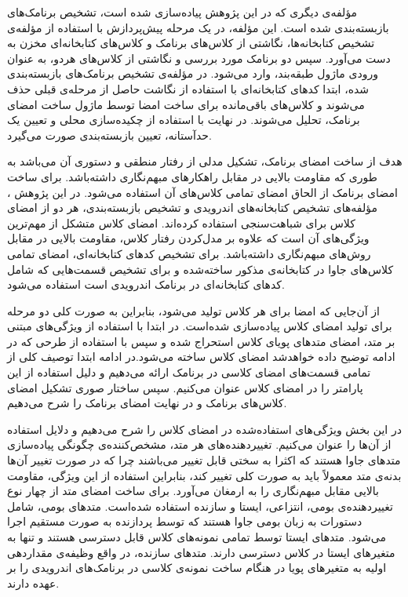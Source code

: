 مؤلفه‌ی دیگری که در این پژوهش پیاده‌سازی شده است، تشخیص برنامک‌های بازبسته‌بندی شده است. این مؤلفه‌، در یک مرحله پیش‌پردازش با استفاده از مؤلفه‌ی تشخیص کتابخانه‌ها، نگاشتی از کلاس‌های برنامک و کلاس‌های کتابخانه‌ای مخزن به دست می‌آورد. سپس دو برنامک مورد بررسی و نگاشتی از کلاس‌‌های هردو، به عنوان ورودی ماژول طبقه‌بند، وارد می‌شود. در مؤلفه‌ی‌ تشخیص برنامک‌های بازبسته‌بندی شده، ابتدا کد‌های کتابخانه‌ای با استفاده از نگاشت حاصل از مرحله‌ی قبلی حذف می‌شوند و کلاس‌های باقی‌مانده برای ساخت امضا توسط ماژول ساخت امضا‌ی برنامک، تحلیل می‌شوند. در نهایت با استفاده از چکیده‌سازی محلی و تعیین یک حدآستانه، تعیین بازبسته‌بندی صورت می‌گیرد.

هدف از ساخت امضای برنامک، تشکیل مدلی از رفتار منطقی و دستوری آن می‌باشد به طوری که مقاومت بالایی در مقابل راهکار‌های مبهم‌نگاری داشته‌باشد. برای ساخت امضای‌ برنامک از الحاق امضای تمامی کلاس‌های آن استفاده می‌شود. در این پژوهش ، مؤلفه‌ها‌ی تشخیص کتابخانه‌های اندرویدی و تشخیص بازبسته‌بندی، هر دو از امضا‌ی کلاس برای شباهت‌سنجی استفاده کرده‌اند. امضای کلاس‌ متشکل از مهم‌ترین ویژگی‌های آن است که علاوه بر مدل‌کردن رفتار کلاس، مقاومت بالایی در مقابل روش‌های مبهم‌نگاری داشته‌باشد. برای تشخیص کد‌های کتابخانه‌ای، امضای تمامی کلاس‌های جاوا در کتابخانه‌ی مذکور ساخته‌شده و برای تشخیص قسمت‌هایی که شامل‌ کد‌های کتابخانه‌ای در برنامک اندرویدی است استفاده می‌شود.

از آن‌جایی که امضا برای هر کلاس تولید می‌شود، بنابراین به صورت کلی دو مرحله برای تولید امضا‌ی کلاس پیاده‌سازی شده‌است. در ابتدا با استفاده از ویژگی‌های مبتنی بر متد، امضای متد‌های پویای کلاس استحراج شده و سپس با استفاده از طرحی که در ادامه توضیح داده خواهد‌شد امضای کلاس ساخته می‌شود.در ادامه ابتدا توصیف کلی از تمامی قسمت‌های امضای کلاسی در برنامک ارائه می‌دهیم و دلیل استفاده از این پارامتر را در امضای کلاس عنوان می‌کنیم. سپس ساختار صوری تشکیل امضای کلاس‌های برنامک و در نهایت امضای برنامک را شرح می‌دهیم.

در این بخش ویژگی‌های استفاده‌شده در امضای کلاس را شرح می‌دهیم و دلایل استفاده از آن‌ها را عنوان می‌کنیم.
 تغییردهنده‌های هر متد، مشخص‌کننده‌ی چگونگی پیاده‌سازی متد‌های جاوا هستند که اکثرا به سختی قابل تغییر می‌باشند چرا که در صورت تغییر آن‌ها بدنه‌ی متد معمولاً باید به صورت کلی تغییر کند، بنابراین استفاده از این ويژگی‌، مقاومت‌ بالایی مقابل مبهم‌نگاری را به ارمغان می‌آورد. برای ساخت امضای متد از چهار نوع تغییردهنده‌ی بومی، انتزاعی، ایستا و سازنده استفاده شده‌است. متد‌های بومی، شامل دستورات به زبان بومی جاوا هستند که توسط پردازنده به صورت مستقیم اجرا می‌شود. متد‌های ایستا توسط تمامی نمونه‌های کلاس قابل دسترسی هستند و تنها به متغیر‌های ایستا در کلاس دسترسی دارند. متد‌های سازنده، در واقع وظیفه‌ی مقداردهی اولیه به متغیر‌های پویا در هنگام ساخت نمونه‌ی کلاسی در برنامک‌های اندرویدی را بر عهده دارند.

